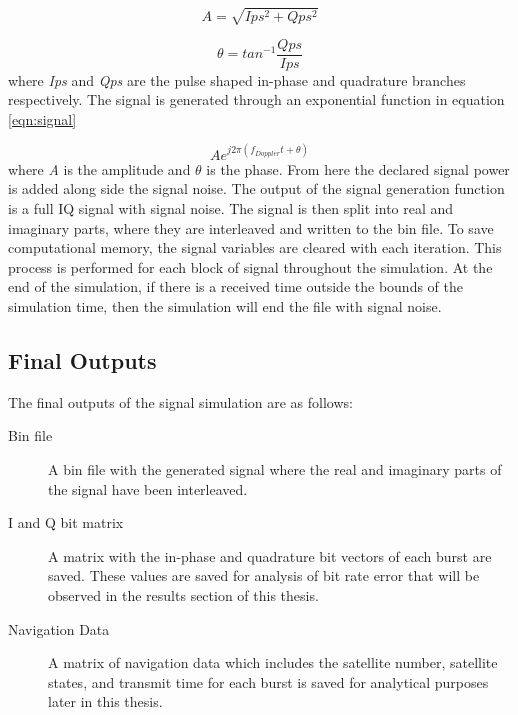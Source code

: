 \documentclass[12pt]{report}
\begin{document}
\begin{equation}
    A = \sqrt{Ips^2 + Qps^2}
    \label{eqn:amplitude}
\end{equation}

\begin{equation}
    \theta = tan^{-1} \frac{Qps}{Ips}
    \label{eqn:phase}
\end{equation}
where \textit{Ips} and \textit{Qps} are the pulse shaped in-phase and quadrature branches respectively. The signal is generated through an exponential function in equation \ref{eqn:signal}

\begin{equation}
    A e^{j2\pi (f_{Doppler}t + \theta)}
    \label{eqn:signal}
\end{equation}
where \textit{A} is the amplitude and $\theta$ is the phase. From here the declared signal power is added along side the signal noise. The output of the signal generation function is a full IQ signal with signal noise. The signal is then split into real and imaginary parts, where they are interleaved and written to the bin file. To save computational memory, the signal variables are cleared with each iteration. This process is performed for each block of signal throughout the simulation. At the end of the simulation, if there is a received time outside the bounds of the simulation time, then the simulation will end the file with signal noise.

\subsection{Final Outputs}
The final outputs of the signal simulation are as follows:
\begin{description}
    \item[Bin file] A bin file with the generated signal where the real and imaginary parts of the signal have been interleaved.
    \item[I and Q bit matrix] A matrix with the in-phase and quadrature bit vectors of each burst are saved. These values are saved for analysis of bit rate error that will be observed in the results section of this thesis.
    \item[Navigation Data] A matrix of navigation data which includes the satellite number, satellite states, and transmit time for each burst is saved for analytical purposes later in this thesis.
\end{description}
\end{document}
